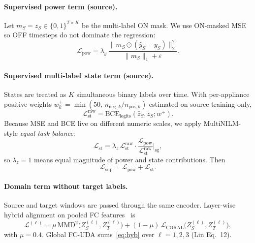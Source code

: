 \documentclass[journal]{IEEEtran}
\begin{document}
\paragraph{Supervised power term (source).}
Let $m_S=z_S\in\{0,1\}^{T\times K}$ be the multi-label ON mask.
We use ON-masked MSE so OFF timesteps do not dominate the regression:
\begin{equation}
\mathcal{L}_{\mathrm{pow}}
=
\lambda_{y}\,
\frac{\big\|m_S\odot(\hat{y}_S-y_S)\big\|_2^{2}}{\|m_S\|_1+\varepsilon}.
\label{eq:pow}
\end{equation}

\paragraph{Supervised multi-label state term (source).}
States are treated as $K$ simultaneous binary labels over time.
With per-appliance positive weights $w^{+}_{k}=\min(50,\,n_{\mathrm{neg},k}/n_{\mathrm{pos},k})$ estimated on source training only,
\begin{equation}
\mathcal{L}_{\mathrm{st}}^{\mathrm{raw}}
=
\mathrm{BCE}_{\mathrm{logits}}(\hat{z}_S,z_S;w^{+}).
\label{eq:st}
\end{equation}
Because MSE and BCE live on different numeric scales, we apply MultiNILM-style \emph{equal task balance}:
\begin{equation}
\mathcal{L}_{\mathrm{st}}
=
\lambda_{z}\,
\mathcal{L}_{\mathrm{st}}^{\mathrm{raw}}
\cdot
\frac{\mathcal{L}_{\mathrm{pow}}}{\mathcal{L}_{\mathrm{st}}^{\mathrm{raw}}}\Big|_{\mathrm{sg}},
\label{eq:balance}
\end{equation}
so $\lambda_{z}{=}1$ means equal magnitude of power and state contributions.
Then
\begin{equation}
\mathcal{L}_{\mathrm{sup}}=\mathcal{L}_{\mathrm{pow}}+\mathcal{L}_{\mathrm{st}}.
\label{eq:sup}
\end{equation}

\paragraph{Domain term without target labels.}
Source and target windows are passed through the same encoder.
Layer-wise hybrid alignment on pooled FC features~\cite{lin2022dda,sun2016deepcoral} is
\begin{equation}
\mathcal{L}^{(\ell)}
=
\mu\,\mathrm{MMD}^{2}\!\big(Z_S^{(\ell)},Z_T^{(\ell)}\big)
+
(1-\mu)\,\mathcal{L}_{\mathrm{CORAL}}\!\big(Z_S^{(\ell)},Z_T^{(\ell)}\big),
\label{eq:hyb}
\end{equation}
with $\mu{=}0.4$.
Global FC-UDA sums~\eqref{eq:hyb} over $\ell=1,2,3$ (Lin Eq.~12).
\end{document}
